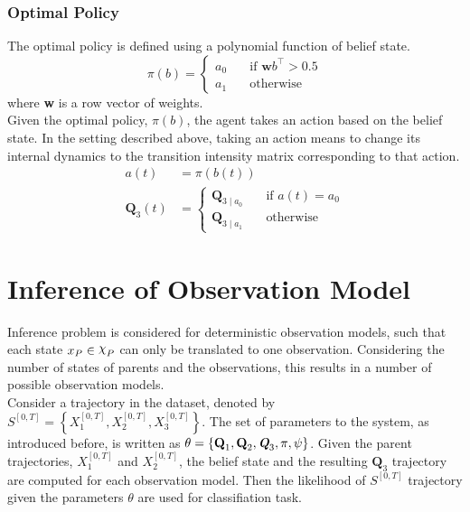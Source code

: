 \subsubsection{Optimal Policy}
The optimal policy is defined using a polynomial function of belief state.
\begin{equation}
\pi(b) = 
\begin{cases}
a_0 & \quad \text{if } \textbf{w}b^\intercal > 0.5 \\
a_1 & \quad \text{otherwise}
\end{cases}
\label{eq:policy}
\end{equation}
where \textbf{w} is a row vector of weights.\\
Given the optimal policy, $ \pi(b) $, the agent takes an action based on the belief state. In the setting described above, taking an action means to change its internal dynamics to the transition intensity matrix corresponding to that action.
\begin{align}
a(t) &= \pi(b(t))\\
\textbf{Q}_3(t) & = \begin{cases}
\textbf{Q}_{3\mid a_{0}} & \quad \text{if } a(t) = a_0 \\
\textbf{Q}_{3\mid a_{1}} & \quad \text{otherwise}
\end{cases}
\label{eq:Q_3_traj}
\end{align}

\section{Inference of Observation Model}
\label{sec:inf_setup}
Inference problem is considered for deterministic observation models, such that each state $ x_P \in \rchi_P $ can only be translated to one observation. Considering the number of states of parents and the observations, this results in a number of possible observation models. \\
Consider a trajectory in the dataset, denoted by $ S^{[0,T]} = \left\lbrace X_1^{[0,T]} , X_2^{[0,T]}, X_3^{[0,T]}\right\rbrace $. The set of parameters to the system, as introduced before, is written as $  \theta = \left\lbrace  \textbf{Q}_{1}, \textbf{Q}_{2}, \textit{\textbf{Q}}_3, \pi, \psi \right\rbrace $. Given the parent trajectories, $ X_1^{[0,T]} $ and $ X_2^{[0,T]} $, the belief state and the resulting $ \textbf{Q}_3 $ trajectory are computed for each observation model. Then the likelihood of $ S^{[0,T]} $ trajectory given the parameters $ \theta $ are used for classifiation task.

